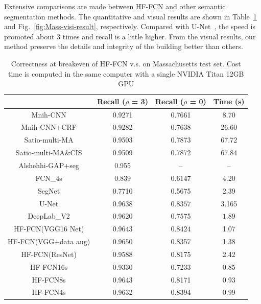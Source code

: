 Extensive comparisons are made between HF-FCN and other semantic segmentation methods. The quantitative and visual results are shown in Table~\ref{table:Mass-results} and Fig.~\ref{fig:Mass-visi-result}, respectively.
Compared with U-Net~\cite{IEEEexample:ronneberger2015u}, the speed is promoted about 3 times and recall is a little higher. 
From the visual results, our method preserve the details and integrity of the building better than others.
\begin{table}
\vspace{-0.2cm}
\setlength{\belowcaptionskip}{-1cm} 
\centering
\caption {Correctness at breakeven of HF-FCN v.s. \cite{IEEEexample:mnih2013machine}\cite{IEEEexample:saito2016multiple}\cite{IEEEexample:alshehhi2017simultaneous}\cite{IEEEexample:Long_2015_CVPR}\cite{IEEEexample:badrinarayanan2017segnet}
\cite{IEEEexample:ronneberger2015u}\cite{IEEEexample:chen2016deeplab}on Massachusetts test set. Cost time is computed in the same computer with a single NVIDIA Titan 12GB GPU}
\label{table:Mass-results}
\begin{tabular}{cccc}
\hline
&Recall ($\rho$ = 3)&Recall ($\rho$ = 0)&Time (s)\\
\hline
Mnih-CNN \cite{IEEEexample:mnih2013machine}&0.9271&0.7661&8.70\\
Mnih-CNN+CRF\cite{IEEEexample:mnih2013machine} &0.9282&0.7638&26.60\\
Satio-multi-MA \cite{IEEEexample:saito2016multiple}&0.9503&0.7873&67.72\\
Satio-multi-MA\&CIS \cite{IEEEexample:saito2016multiple}&0.9509&0.7872&67.84\\
Alshehhi-GAP+seg \cite{IEEEexample:alshehhi2017simultaneous}&0.955&{--}&{--} \\ \hline
FCN\_4s\cite{IEEEexample:Long_2015_CVPR}&0.839&0.6147&4.20\\
SegNet\cite{IEEEexample:badrinarayanan2017segnet}&0.7710&0.5675&2.39\\
U-Net\cite{IEEEexample:ronneberger2015u}& $\bm{0.9638}$& $\bm{0.8357}$& 3.165\\
DeepLab\_V2\cite{IEEEexample:chen2016deeplab}&0.9620&0.7575&$\bm{1.89}$\\ \hline
HF-FCN(VGG16 Net)&0.9643& $\bm{0.8424}$ &1.07\\
HF-FCN(VGG+data aug)&$\bm{0.9650}$&0.8357&1.38\\
HF-FCN(ResNet)&0.9588&0.8175&2.42\\
HF-FCN16s &0.9330&0.7233&0.85\\
HF-FCN8s &0.9643&0.8171&0.93\\
HF-FCN4s &0.9632&0.8394&$\bm{0.99}$\\
\hline
\end{tabular}
\end{table}

